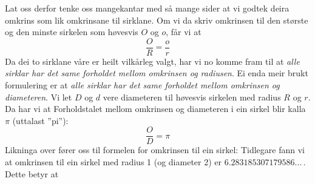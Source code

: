 {Lat oss derfor tenke oss mangekantar med så mange sider at vi godtek deira omkrins som lik omkrinsane til sirklane. Om vi da skriv omkrinsen til den største og den minste sirkelen som høvesvis $ O $ og $ o $, får vi at
\[ \frac{O}{R}=\frac{o}{r} \]
Da dei to sirklane våre er heilt vilkårleg valgt, har vi no komme fram til at \textit{alle sirklar har det same forholdet mellom omkrinsen og radiusen}. Ei enda meir brukt formulering er at \textit{alle sirklar har det same forholdet mellom omkrinsen og diameteren}. Vi let $ D $ og $ d $ vere diameteren til høvesvis sirkelen med radius $ R $ og $ r $. Da har vi at
Forholdstalet mellom omkrinsen og diameteren i ein sirkel blir kalla $ \pi $ \index{$ \pi $}(uttalast ''pi''):
\[ \frac{O}{D}=\pi \]
Likninga over fører oss til formelen for omkrinsen til ein sirkel:
Tidlegare fann vi at omkrinsen til ein sirkel med radius 1 (og diameter 2) er $ 6.283185307179586... $\,. Dette betyr at
} \vsk

\vsk

